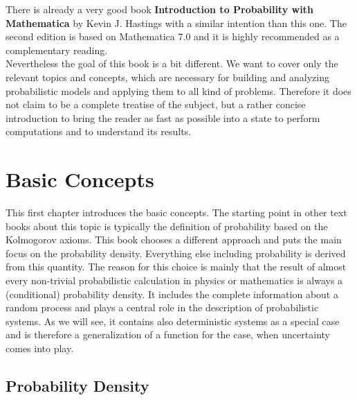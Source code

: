 \documentclass{tstextbook}
\begin{document}
There is already a very good book \textbf{Introduction to Probability with Mathematica} by Kevin J. Hastings \cite{hastings2001} with a similar intention than this one. The second edition is based on Mathematica 7.0 and it is highly recommended as a complementary reading.\\

Nevertheless the goal of this book is a bit different. We want to cover only the relevant topics and concepts, which are necessary for building and analyzing probabilistic models and applying them to all kind of problems. Therefore it does not claim to be a complete treatise of the subject, but a rather concise introduction to bring the reader as fast as possible into a state to perform computations and to understand its results.    

\chapter{Basic Concepts}

\begin{summary}
  This first chapter introduces the basic concepts. The starting point in other text books about this topic is typically the definition of probability based on the Kolmogorov axioms. This book chooses a different approach and puts the main focus on the probability density. Everything else including probability is derived from this quantity. The reason for this choice is mainly that the result of almost every non-trivial probabilistic calculation in physics or mathematics is always a (conditional) probability density. It includes the complete information about a random process and plays a central role in the description of probabilistic systems. As we will see, it contains also deterministic systems as a special case and is therefore a generalization of a function for the case, when uncertainty comes into play.     
\end{summary}

\section{Probability Density}
\end{document}
